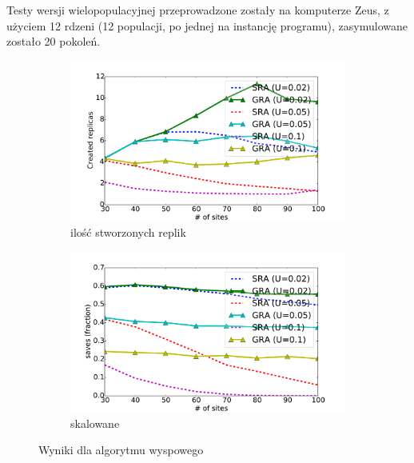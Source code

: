 \documentclass[11pt,pdftex,a4paper]{scrartcl}
\begin{document}
Testy wersji wielopopulacyjnej przeprowadzone zostały na komputerze Zeus, z użyciem 12 rdzeni (12 
populacji, po jednej na instancję programu), zasymulowane zostało 20 pokoleń.

\begin{figure}[H]
    \centering
    \begin{subfigure}[b]{0.49\textwidth} 
        \includegraphics[width=\textwidth]{plots/replicas_isl}
        \caption{ilość stworzonych replik}
    \end{subfigure}
    \begin{subfigure}[b]{0.49\textwidth}
        \includegraphics[width=\textwidth]{plots/saves_isl}
        \caption{skalowane}
    \end{subfigure}

    \caption{Wyniki dla algorytmu wyspowego}
    \label{plot:original}
\end{figure}
\end{document}
